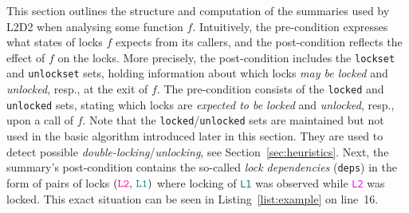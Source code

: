 \documentclass[runningheads]{llncs}
\newcommand{\LLDD}{\textsc{L2D2}\xspace} %
\begin{document}
This section outlines the structure and computation of the summaries used by
\LLDD when analysing some function $f$. Intuitively, the pre-condition expresses
what states of locks $f$ expects from its callers, and the post-condition
reflects the effect of $f$ on the locks. More precisely, the post-condition
includes the \texttt{lockset} and \texttt{unlockset} sets, holding information
about which locks \emph{may be locked} and \emph{unlocked}, resp., at the exit
of $f$. The pre-condition consists of the \texttt{locked} and \texttt{unlocked}
sets, stating which locks are \emph{expected to be locked} and \emph{unlocked},
resp., upon a call of $f$. Note that the \texttt{locked}/\texttt{unlocked} sets
are maintained but not used in the basic algorithm introduced later in this
section. They are used to detect possible
\emph{double-locking}/\emph{unlocking}, see Section~\ref{sec:heuristics}. Next,
the summary's post-condition contains the so-called \emph{lock dependencies}
(\texttt{deps}) in the form of pairs of locks
$(\text{\texttt{\textcolor{magenta}{L2}}, \texttt{\textcolor{teal}{L1}}})$ where
locking of \texttt{\textcolor{teal}{L1}} was observed while
\texttt{\textcolor{magenta}{L2}} was locked. This exact situation can be seen in
Listing~\ref{list:example} on line~16.
\end{document}

